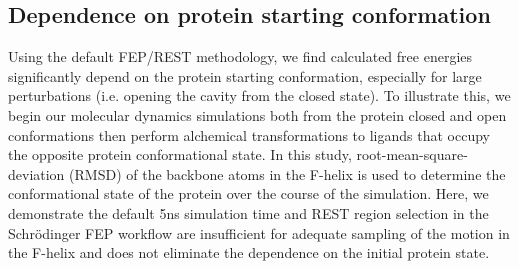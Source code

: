 \documentclass[journal=jctcce,manuscript=article]{achemso}
\begin{document}
\subsection*{Dependence on protein starting conformation}
Using the default FEP/REST methodology\cite{FEP/REST}, we find calculated free energies significantly depend on the protein starting conformation, especially for large perturbations (i.e. opening the cavity from the closed state).
To illustrate this, we begin our molecular dynamics simulations both from the protein closed and open conformations then perform alchemical transformations to ligands that occupy the opposite protein conformational state.
In this study, root-mean-square-deviation (RMSD) of the backbone atoms in the F-helix is used to determine the conformational state of the protein over the course of the simulation.
Here, we demonstrate the default 5ns simulation time and REST region selection in the Schr\"{o}dinger FEP workflow are insufficient for adequate sampling of the motion in the F-helix and does not eliminate the dependence on the initial protein state.
\end{document}
